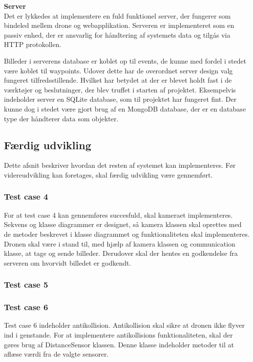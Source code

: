 \newpage

\textbf{Server}\\
Det er lykkedes at implementere en fuld funktionel server, der fungerer som bindeled mellem drone og webapplikation. Serveren er implementeret som en passiv enhed, der er ansvarlig for håndtering af systemets data og tilgås via HTTP protokollen. 

Billeder i serverens database er koblet op til events, de kunne med fordel i stedet være koblet til waypoints. Udover dette har de overordnet server design valg fungeret tilfredsstillende. Hvilket har betydet at der er blevet holdt fast i de værktøjer og beslutninger, der blev truffet i starten af projektet. Eksempelvis indeholder server en SQLite database, som til projektet har fungeret fint. Der kunne dog i stedet være gjort brug af en MongoDB database, der er en database type der håndterer data som objekter.


\newpage

\subsection{Færdig udvikling}
Dette afsnit beskriver hvordan det resten af systemet kan implementeres. Før videreudvikling kan foretages, skal færdig udvikling være gennemført.

\subsubsection*{Test case 4}
For at test case 4 kan gennemføres succesfuld, skal kameraet implementeres. 
Sekvens og klasse diagrammer er designet, så kamera klassen skal oprettes med de metoder beskrevet i klasse diagrammet og funktionaliteten skal implementeres. \\
Dronen skal være i stand til, med hjælp af kamera klassen og communication klasse, at tage og sende billeder. Derudover skal der hentes en godkendelse fra serveren om hvorvidt billedet er godkendt.


\subsubsection*{Test case 5}

\subsubsection*{Test case 6}
Test case 6 indeholder antikollision. Antikollision skal sikre at dronen ikke flyver ind i genstande. For at implementere antikollisions funktionaliteten, skal der gøres brug af DistanceSensor klassen. Denne klasse indeholder metoder til at aflæse værdi fra de valgte sensorer. 


